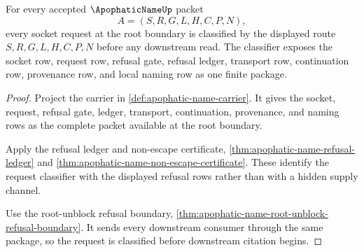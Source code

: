 


\begin{theorem}
\label{thm:apophatic-name-root-request-classifier-totality}
For every accepted $\ApophaticNameUp$ packet
$$
A=(S,R,G,L,H,C,P,N),
$$
every socket request at the root boundary is classified by the displayed route $S,R,G,L,H,C,P,N$ before any downstream read. The classifier exposes the socket row, request row, refusal gate, refusal ledger, transport row, continuation row, provenance row, and local naming row as one finite package.
\end{theorem}
\begin{proof}
Project the carrier in \autoref{def:apophatic-name-carrier}. It gives the socket, request, refusal gate, ledger, transport, continuation, provenance, and naming rows as the complete packet available at the root boundary.

Apply the refusal ledger and non-escape certificate, \autoref{thm:apophatic-name-refusal-ledger} and \autoref{thm:apophatic-name-non-escape-certificate}. These identify the request classifier with the displayed refusal rows rather than with a hidden supply channel.

Use the root-unblock refusal boundary, \autoref{thm:apophatic-name-root-unblock-refusal-boundary}. It sends every downstream consumer through the same package, so the request is classified before downstream citation begins.
\end{proof}

